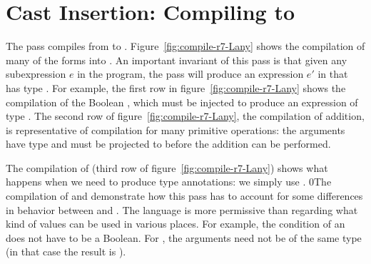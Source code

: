 \documentclass[7x10]{TimesAPriori_MIT}%
\def\racketEd{0}
\def\edition{0}
\newcommand{\racket}[1]{{\if\edition\racketEd{#1}\fi}}
\numberwithin{theorem}{chapter}
\numberwithin{definition}{chapter}
\numberwithin{equation}{chapter}
\begin{document}
\section{Cast Insertion: Compiling \LangDyn{} to \LangAny{}}
\label{sec:compile-r7}

The  pass compiles from \LangDyn{} to \LangAny{}.
Figure~\ref{fig:compile-r7-Lany} shows the compilation of many of the
\LangDyn{} forms into \LangAny{}. An important invariant of this pass
is that given any subexpression $e$ in the \LangDyn{} program, the
pass will produce an expression $e'$ in \LangAny{} that has type
\ANYTY{}. For example, the first row in
figure~\ref{fig:compile-r7-Lany} shows the compilation of the Boolean
\TRUE{}, which must be injected to produce an expression of type
\ANYTY{}.
%
The second row of figure~\ref{fig:compile-r7-Lany}, the compilation of
addition, is representative of compilation for many primitive
operations: the arguments have type \ANYTY{} and must be projected to
\INTTYPE{} before the addition can be performed.

The compilation of  (third row of
figure~\ref{fig:compile-r7-Lany}) shows what happens when we need to
produce type annotations: we simply use \ANYTY{}.
%
\racket{The compilation of  and   demonstrate how
  this pass has to account for some differences in behavior between
  \LangDyn{} and \LangAny{}. The \LangDyn{} language is more
  permissive than \LangAny{} regarding what kind of values can be used
  in various places. For example, the condition of an \key{if} does
  not have to be a Boolean. For \key{eq?}, the arguments need not be
  of the same type (in that case the result is \code{\#f}).}
\end{document}
